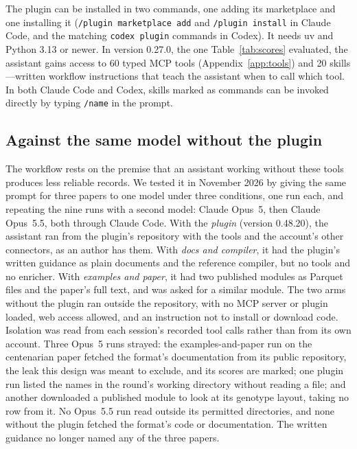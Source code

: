 \documentclass[11pt,a4paper]{article}
\begin{document}
The plugin can be installed in two commands, one adding its marketplace and one
installing it (\texttt{/plugin marketplace add} and \texttt{/plugin install} in
Claude Code, and the matching \texttt{codex plugin} commands in Codex). It
needs uv and Python 3.13 or newer. In version 0.27.0, the one Table~\ref{tab:scores}
evaluated, the assistant gains access to 60 typed
MCP tools (Appendix~\ref{app:tools}) and 20 skills---written workflow
instructions that teach the assistant when to call which tool. In both
Claude Code and Codex, skills marked as commands can be invoked directly
by typing \texttt{/name} in the prompt.

\subsection{Against the same model without the plugin}
\label{sec:baseline}

The workflow rests on the premise that an assistant working without these
tools produces less reliable records. We tested it in November 2026 by giving
the same prompt for three papers to one model under three conditions, one run
each, and repeating the nine runs with a second model: Claude Opus~5, then
Claude Opus~5.5, both through Claude Code. With the \emph{plugin} (version
0.48.20), the assistant ran from the plugin's repository with the tools and
the account's other connectors, as an author has them. With \emph{docs and
compiler}, it had the plugin's written guidance as plain documents and the
reference compiler, but no tools and no enricher. With \emph{examples and
paper}, it had two published modules as Parquet files and the paper's full
text, and was asked for a similar module. The two arms without the plugin ran
outside the repository, with no MCP server or plugin loaded, web access
allowed, and an instruction not to install or download code. Isolation was
read from each session's recorded tool calls rather than from its own
account. Three Opus~5 runs strayed: the examples-and-paper run on the
centenarian paper fetched the format's documentation from its public
repository, the leak this design was meant to exclude, and its scores are
marked; one plugin run listed the names in the round's working directory
without reading a file; and another downloaded a published module to look at
its genotype layout, taking no row from it. No Opus~5.5 run read outside its permitted directories, and none without the
plugin fetched the format's code or documentation. The
written guidance no longer named any of the three papers.
\end{document}
